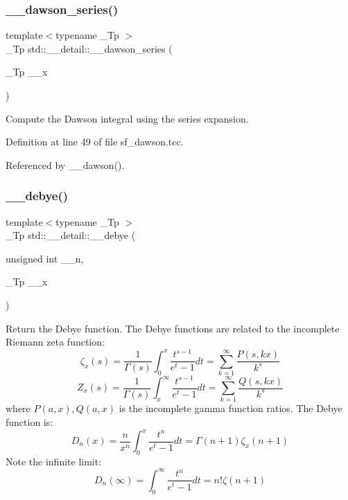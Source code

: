\subsubsection{\texorpdfstring{\+\_\+\+\_\+dawson\+\_\+series()}{\_\_dawson\_series()}}
{\footnotesize\ttfamily template$<$typename \+\_\+\+Tp $>$ \\
\+\_\+\+Tp std\+::\+\_\+\+\_\+detail\+::\+\_\+\+\_\+dawson\+\_\+series (\begin{DoxyParamCaption}\item[{\+\_\+\+Tp}]{\+\_\+\+\_\+x }\end{DoxyParamCaption})}



Compute the Dawson integral using the series expansion. 



Definition at line 49 of file sf\+\_\+dawson.\+tcc.



Referenced by \+\_\+\+\_\+dawson().

\mbox{\label{namespacestd_1_1____detail_a26d3f285cfbcaba6fa30d3e4164c6187}} 
\subsubsection{\texorpdfstring{\+\_\+\+\_\+debye()}{\_\_debye()}}
{\footnotesize\ttfamily template$<$typename \+\_\+\+Tp $>$ \\
\+\_\+\+Tp std\+::\+\_\+\+\_\+detail\+::\+\_\+\+\_\+debye (\begin{DoxyParamCaption}\item[{unsigned int}]{\+\_\+\+\_\+n,  }\item[{\+\_\+\+Tp}]{\+\_\+\+\_\+x }\end{DoxyParamCaption})}

Return the Debye function. The Debye functions are related to the incomplete Riemann zeta function\+: \[ \zeta_x(s) = \frac{1}{\Gamma(s)}\int_{0}^{x}\frac{t^{s-1}}{e^t-1}dt = \sum_{k=1}^{\infty}\frac{P(s,kx)}{k^s} \] \[ Z_x(s) = \frac{1}{\Gamma(s)}\int_{x}^{\infty}\frac{t^{s-1}}{e^t-1}dt = \sum_{k=1}^{\infty}\frac{Q(s,kx)}{k^s} \] where $ P(a,x), Q(a,x) $ is the incomplete gamma function ratios. The Debye function is\+: \[ D_n(x) = \frac{n}{x^n}\int_{0}^{x}\frac{t^n}{e^t-1}dt = \Gamma(n+1)\zeta_x(n+1) \] Note the infinite limit\+: \[ D_n(\infty) = \int_{0}^{\infty}\frac{t^n}{e^t-1}dt = n!\zeta(n+1) \]

